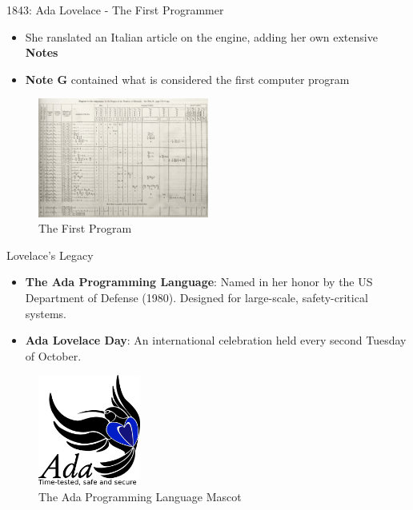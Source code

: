 \documentclass{beamer}
\begin{document}
\begin{frame}[t]{1843: Ada Lovelace - The First Programmer}
        \begin{itemize}
            \item She ranslated an Italian article on the engine, adding her own extensive \textbf{Notes}
            \item \textbf{Note G} contained what is considered the first computer program
        \end{itemize}
        \begin{figure}[b]
            \centering
            \includegraphics[width=0.5\textwidth]{images/Diagram_for_the_computation_of_Bernoulli_numbers.jpg}
            \caption{The First Program}
        \end{figure}
\end{frame}


\begin{frame}[t]{Lovelace's Legacy}
\begin{itemize}
    \item \textbf{The Ada Programming Language}: Named in her honor by the US Department of Defense (1980). Designed for large-scale, safety-critical systems.
    \item \textbf{Ada Lovelace Day}: An international celebration held every second Tuesday of October.
\end{itemize}


    \begin{figure}[b]
        \centering
        \includegraphics[width=0.3\textwidth]{images/Ada_logo.png}
        \caption{The Ada Programming Language Mascot}
    \end{figure}
\end{frame}
\end{document}
